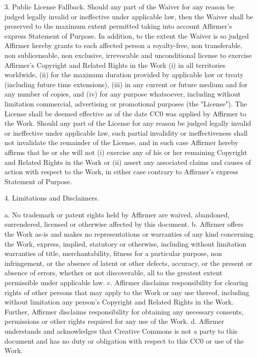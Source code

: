 \documentclass[parskip=half]{scrartcl}
\begin{document}
3. Public License Fallback. Should any part of the Waiver for any reason
be judged legally invalid or ineffective under applicable law, then the
Waiver shall be preserved to the maximum extent permitted taking into
account Affirmer's express Statement of Purpose. In addition, to the
extent the Waiver is so judged Affirmer hereby grants to each affected
person a royalty-free, non transferable, non sublicensable, non exclusive,
irrevocable and unconditional license to exercise Affirmer's Copyright and
Related Rights in the Work (i) in all territories worldwide, (ii) for the
maximum duration provided by applicable law or treaty (including future
time extensions), (iii) in any current or future medium and for any number
of copies, and (iv) for any purpose whatsoever, including without
limitation commercial, advertising or promotional purposes (the
"License"). The License shall be deemed effective as of the date CC0 was
applied by Affirmer to the Work. Should any part of the License for any
reason be judged legally invalid or ineffective under applicable law, such
partial invalidity or ineffectiveness shall not invalidate the remainder
of the License, and in such case Affirmer hereby affirms that he or she
will not (i) exercise any of his or her remaining Copyright and Related
Rights in the Work or (ii) assert any associated claims and causes of
action with respect to the Work, in either case contrary to Affirmer's
express Statement of Purpose.

4. Limitations and Disclaimers.

 a. No trademark or patent rights held by Affirmer are waived, abandoned,
    surrendered, licensed or otherwise affected by this document.
 b. Affirmer offers the Work as-is and makes no representations or
    warranties of any kind concerning the Work, express, implied,
    statutory or otherwise, including without limitation warranties of
    title, merchantability, fitness for a particular purpose, non
    infringement, or the absence of latent or other defects, accuracy, or
    the present or absence of errors, whether or not discoverable, all to
    the greatest extent permissible under applicable law.
 c. Affirmer disclaims responsibility for clearing rights of other persons
    that may apply to the Work or any use thereof, including without
    limitation any person's Copyright and Related Rights in the Work.
    Further, Affirmer disclaims responsibility for obtaining any necessary
    consents, permissions or other rights required for any use of the
    Work.
 d. Affirmer understands and acknowledges that Creative Commons is not a
    party to this document and has no duty or obligation with respect to
    this CC0 or use of the Work.
\end{document}

